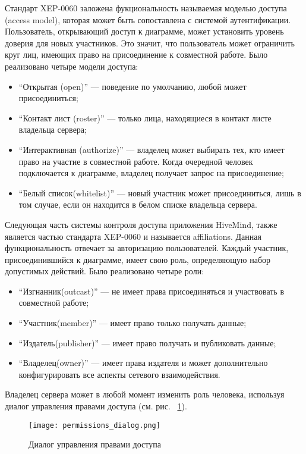 Стандарт XEP-0060 заложена фукциональность называемая моделью доступа (access model), которая может быть сопоставлена с системой аутентификации. Пользователь, открывающий доступ к диаграмме, может установить уровень доверия для новых участников. Это значит, что пользователь может ограничить круг лиц, имеющих право на присоединение к совместной работе. Было реализовано четыре модели доступа:
\begin{itemize}
\item ``Открытая (open)'' --- поведение по умолчанию,  любой может присоединиться;
\item ``Контакт лист (roster)'' --- только лица, находящиеся в контакт листе владельца сервера;
\item ``Интерактивная (authorize)'' --- владелец может выбирать тех, кто имеет право на участие в совместной работе. Когда очередной человек подключается к диаграмме, владелец получает запрос на присоединение;
\item ``Белый список(whitelist)'' --- новый участник может присоединиться, лишь в том случае, если он находится в белом списке владельца сервера.
\end{itemize}

Следующая часть системы контроля доступа приложения HiveMind, также является частью стандарта XEP-0060 и называется affiliations. Данная функциональность отвечает за авторизацию пользователей. Каждый участник, присоединившийся к диаграмме, имеет свою роль, определяющую набор допустимых действий. Было реализовано четыре роли: 
\begin{itemize}
\item ``Изгнанник(outcast)'' --- не имеет права присоединяться и участвовать в совместной работе;
\item ``Участник(member)'' --- имеет право только получать данные;
\item ``Издатель(publisher)'' --- имеет право получать и публиковать данные;
\item ``Владелец(owner)'' ---  имеет права издателя и может дополнительно конфигурировать все аспекты сетевого взаимодействия.
\end{itemize}
Владелец сервера может в любой момент изменить роль человека, используя диалог управления правами доступа (см. рис. ~\ref{img:permissions_dialog}).

\begin{figure}[b] 
  \centering
  \texttt{[image: permissions\_dialog.png]}
  \caption{Диалог управления правами доступа}
  \label{img:permissions_dialog}
\end{figure}

